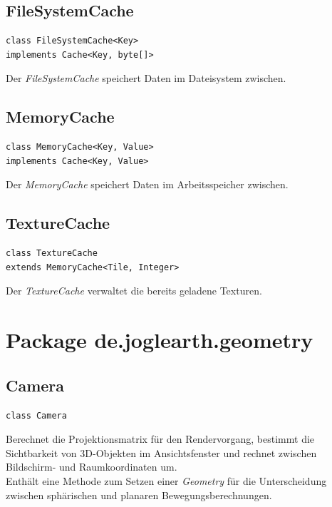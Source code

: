 \documentclass[10pt]{scrreprt}
\begin{document}
\vspace{5mm}
\subsection*{FileSystemCache}
\begin{lstlisting}
class FileSystemCache<Key>
implements Cache<Key, byte[]>
\end{lstlisting}
Der \textit{FileSystemCache} speichert Daten im Dateisystem zwischen.\\

\vspace{5mm}
\subsection*{MemoryCache}
\begin{lstlisting}
class MemoryCache<Key, Value>
implements Cache<Key, Value>
\end{lstlisting}
Der \textit{MemoryCache} speichert Daten im Arbeitsspeicher zwischen.\\

\newpage
\vspace{5mm}
\subsection*{TextureCache}
\begin{lstlisting}
class TextureCache
extends MemoryCache<Tile, Integer>
\end{lstlisting}
Der \textit{TextureCache} verwaltet die bereits geladene Texturen.\\



\vspace{5mm}
\section{Package de.joglearth.geometry}
\subsection*{Camera}
\begin{lstlisting}
class Camera
\end{lstlisting}
Berechnet die Projektionsmatrix für den Rendervorgang, bestimmt die Sichtbarkeit von 3D-Objekten im Ansichtsfenster und rechnet zwischen Bildschirm- und Raumkoordinaten um.\\
Enthält eine Methode zum Setzen einer \textit{Geometry} für die Unterscheidung zwischen sphärischen und planaren Bewegungsberechnungen.\\
\end{document}
